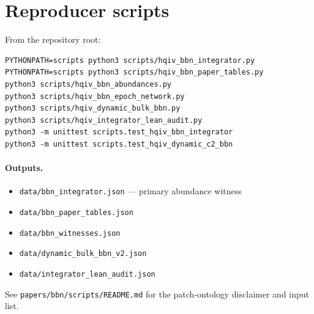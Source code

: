 \documentclass[11pt]{amsart}
\begin{document}
\section{Reproducer scripts}
\label{app:scripts}

From the repository root:
\begin{verbatim}
PYTHONPATH=scripts python3 scripts/hqiv_bbn_integrator.py
PYTHONPATH=scripts python3 scripts/hqiv_bbn_paper_tables.py
python3 scripts/hqiv_bbn_abundances.py
python3 scripts/hqiv_bbn_epoch_network.py
python3 scripts/hqiv_dynamic_bulk_bbn.py
python3 scripts/hqiv_integrator_lean_audit.py
python3 -m unittest scripts.test_hqiv_bbn_integrator
python3 -m unittest scripts.test_hqiv_dynamic_c2_bbn
\end{verbatim}
\paragraph{Outputs.}
\begin{itemize}[leftmargin=2em]
\item \texttt{data/bbn\_integrator.json} --- primary abundance witness
\item \texttt{data/bbn\_paper\_tables.json}
\item \texttt{data/bbn\_witnesses.json}
\item \texttt{data/dynamic\_bulk\_bbn\_v2.json}
\item \texttt{data/integrator\_lean\_audit.json}
\end{itemize}
See \texttt{papers/bbn/scripts/README.md} for the patch-ontology disclaimer and
input list.


{\sloppy\small

}
\end{document}
